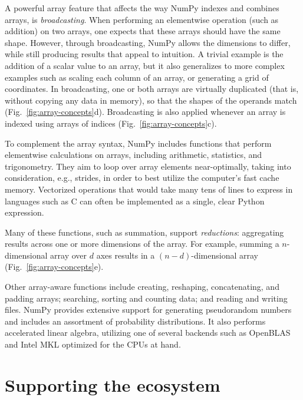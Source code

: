 A powerful array feature that affects the way NumPy indexes and combines
arrays, is {\em broadcasting}.
When performing an elementwise operation (such as addition) on two arrays, one
expects that these arrays should have the same shape.
However, through broadcasting, NumPy allows the dimensions to differ, while
still producing results that appeal to intuition.
A trivial example is the addition of a scalar value to an array, but it also
generalizes to more complex examples such as scaling each column of an array,
or generating a grid of coordinates.
In broadcasting, one or both arrays are virtually duplicated (that is, without
copying any data in memory), so that the shapes of the operands match
(Fig.~\ref{fig:array-concepts}d).
Broadcasting is also applied whenever an array is indexed using arrays of
indices (Fig.~\ref{fig:array-concepts}c).

To complement the array syntax, NumPy includes functions that perform
elementwise calculations on arrays, including arithmetic, statistics, and
trigonometry.
They aim to loop over array elements near-optimally, taking into consideration,
e.g., strides, in order to best utilize the computer's fast cache memory.
Vectorized operations that would take many tens of lines to express in
languages such as C can often be implemented as a single, clear Python
expression.

Many of these functions, such as summation, support \emph{reductions}: aggregating
results across one or more dimensions of the array.
For example, summing a $n$-dimensional array over $d$ axes results in a
$(n-d)$-dimensional array (Fig.~\ref{fig:array-concepts}e).

Other array-aware functions include creating, reshaping, concatenating, and padding
arrays; searching, sorting and counting data; and reading and writing files.
NumPy provides extensive support for generating pseudorandom numbers and
includes an assortment of probability distributions.
It also performs accelerated linear algebra, utilizing one of several backends
such as OpenBLAS \cite{wang2013augem,xianyi2012model} and Intel MKL optimized for the CPUs at hand.

\section*{Supporting the ecosystem}



